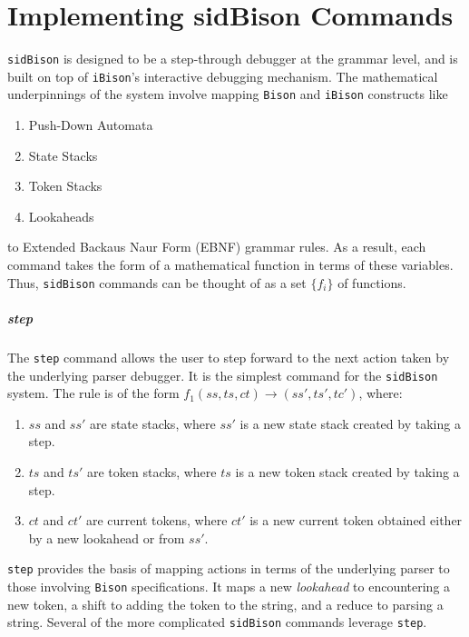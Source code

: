 \chapter{Implementing sidBison Commands}

\verb|sidBison| is designed to be a step-through debugger at the grammar level, and is built on top of \verb|iBison|'s interactive debugging mechanism. The mathematical underpinnings of the system involve mapping \verb|Bison| and \verb|iBison| constructs like 
\begin{enumerate}
\item Push-Down Automata
\item State Stacks
\item Token Stacks
\item Lookaheads
\end{enumerate}
\noindent
to Extended Backaus Naur Form (EBNF) grammar rules. As a result, each command takes the form of a mathematical function in terms of these variables. Thus, \verb|sidBison| commands can be thought of as a set $\{ f_i \}$ of functions.

\paragraph{step}

The \verb|step| command allows the user to step forward to the next action taken by the underlying parser debugger. It is the simplest command for the \verb|sidBison| system. The rule is of the form $f_1(ss, ts, ct) \rightarrow (ss', ts', tc')$, where:

\begin{enumerate}
\item $ss$ and $ss'$ are state stacks, where $ss'$ is a new state stack created by taking a step.
\item $ts$ and $ts'$ are token stacks, where $ts$ is a new token stack created by taking a step.
\item $ct$  and $ct'$ are current tokens, where $ct'$ is a new current token obtained either by a new lookahead or from $ss'$.
\end{enumerate}

\verb|step| provides the basis of mapping actions in terms of the underlying parser to those involving \verb|Bison| specifications. It maps a new \textit{lookahead} to encountering a new token, a shift to adding the token to the string, and a reduce to parsing a string. Several of the more complicated \verb|sidBison| commands leverage \verb|step|.

